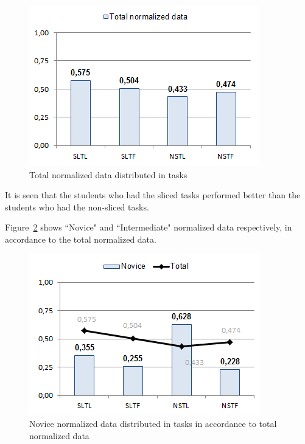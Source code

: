 \documentclass{sig-alternate-05-2015}
\begin{document}
\begin{figure}[!ht]
	\centering
	\includegraphics[width=1\linewidth]{img10}
	\caption{Total normalized data distributed in tasks}
	\label{fig:Total normalized data distributed in tasks}
\end{figure}

It is seen that the students who had the sliced tasks performed better than the students who had the non-sliced tasks.

Figure~\ref{fig:Novice normalized data distributed in tasks in accordance to total normalized data} shows ``Novice" and ``Intermediate" normalized data respectively, in accordance to the total normalized data.

\begin{figure}[!ht]
	\centering
	\includegraphics[width=1\linewidth]{img11}
	\caption{Novice normalized data distributed in tasks in accordance to total normalized data}
	\label{fig:Novice normalized data distributed in tasks in accordance to total normalized data}
\end{figure}
\end{document}
